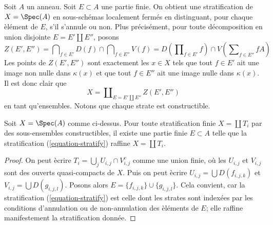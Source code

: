 \noindent
Soit $A$ un anneau. Soit $E \subset A$ une partie finie. On obtient une
stratification de $X = \Spec(A)$ en sous-sch\'emas localement ferm\'es en
distinguant, pour chaque \`el\'ement de $E$, s'il s'annule ou non. Plus pr\'ecis\'ement,
pour toute d\'ecomposition en union disjointe $E = E' \amalg E''$, posons
\begin{equation}
\label{equation-stratum}
Z(E', E'') =
\bigcap\nolimits_{f \in E'} D(f) \cap \bigcap\nolimits_{f \in E''} V(f) =
D(\prod\nolimits_{f \in E'} f) \cap V( \sum\nolimits_{f \in E''} fA)
\end{equation}
Les points de $Z(E', E'')$ sont exactement les $x \in X$ tels que
tout $f \in E'$ ait une image non nulle dans $\kappa(x)$ et que tout $f \in E''$
ait une image nulle dans $\kappa(x)$. Il est donc clair que
\begin{equation}
\label{equation-stratify}
X = \coprod\nolimits_{E = E' \amalg E''} Z(E', E'')
\end{equation}
en tant qu'ensembles. Notons que chaque strate est constructible.

\begin{lemma}
\label{lemma-refine}
Soit $X = \Spec(A)$ comme ci-dessus. Pour toute stratification finie
$X = \coprod T_i$ par des sous-ensembles constructibles, il existe une partie finie
$E \subset A$ telle que la stratification (\ref{equation-stratify})
raffine $X = \coprod T_i$.
\end{lemma}

\begin{proof}
On peut \`ecrire $T_i = \bigcup_j U_{i, j} \cap V_{i, j}^c$ comme une union finie,
o\`u les $U_{i, j}$ et $V_{i, j}$ sont des ouverts quasi-compacts de $X$.
Puis on peut \`ecrire $U_{i, j} = \bigcup D(f_{i, j, k})$ et
$V_{i, j} = \bigcup D(g_{i, j, l})$. Posons alors
$E = \{f_{i, j, k}\} \cup \{g_{i, j, l}\}$. Cela convient, car
la stratification (\ref{equation-stratify}) est celle dont les strates sont
index\'ees par les conditions d'annulation ou de non-annulation des \`el\'ements de $E$; elle
raffine manifestement la stratification donn\'ee.
\end{proof}

